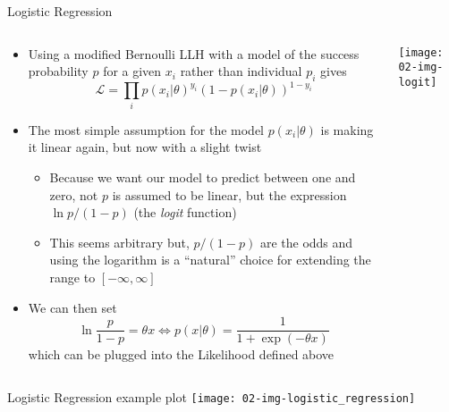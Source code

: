   \begin{frame}{Logistic Regression}
    \begin{columns}
      \begin{column}{0.65\textwidth}
        \begin{itemize}
          \item Using a modified Bernoulli LLH with a model of the success probability $p$ for a given $x_i$ rather than individual $p_i$ gives
          \begin{equation*}
            \mathcal{L} = \prod_i
              p(x_i | \theta)^{y_i} (1 − p(x_i | \theta))^{1 − y_i}
          \end{equation*}
          \item The most simple assumption for the model $p(x_i | \theta)$ is making it linear again, but now with a slight twist
          \begin{itemize}
            \item Because we want our model to predict between one and zero, not $p$ is assumed to be linear, but the expression $\ln{p / (1 - p)}$ (the \emph{logit} function)
            \item This seems arbitrary but, $p / (1 - p)$ are the odds and using the logarithm is a \enquote{natural} choice for extending the range to $[-\infty, \infty]$
          \end{itemize}
          \item We can then set
            \begin{equation}
              \ln \frac{p}{1 - p} = \theta x \Leftrightarrow
                p(x | \theta) = \frac{1}{1 + \exp(-\theta x)}
            \end{equation}
            which can be plugged into the Likelihood defined above
        \end{itemize}
      \end{column}
      \begin{column}{0.35\textwidth}
        \texttt{[image: 02-img-logit]}
      \end{column}
    \end{columns}
  \end{frame}

  \begin{frame}{Logistic Regression example plot}
    \texttt{[image: 02-img-logistic\_regression]}
  \end{frame}

